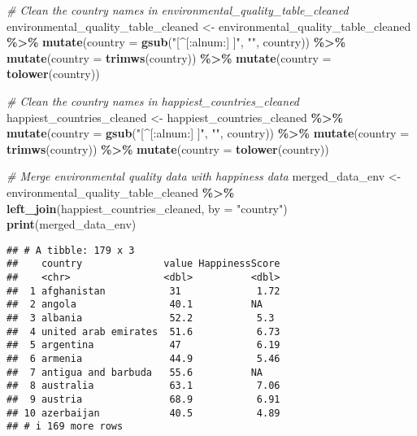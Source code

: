 \documentclass[
]{article}
\newenvironment{Shaded}{\begin{snugshade}}{\end{snugshade}}
\newcommand{\AttributeTok}[1]{\textcolor[rgb]{0.13,0.29,0.53}{#1}}
\newcommand{\CommentTok}[1]{\textcolor[rgb]{0.56,0.35,0.01}{\textit{#1}}}
\newcommand{\FunctionTok}[1]{\textcolor[rgb]{0.13,0.29,0.53}{\textbf{#1}}}
\newcommand{\NormalTok}[1]{#1}
\newcommand{\OtherTok}[1]{\textcolor[rgb]{0.56,0.35,0.01}{#1}}
\newcommand{\SpecialCharTok}[1]{\textcolor[rgb]{0.81,0.36,0.00}{\textbf{#1}}}
\newcommand{\StringTok}[1]{\textcolor[rgb]{0.31,0.60,0.02}{#1}}
\begin{document}
\begin{Shaded}
\begin{Highlighting}[]
\CommentTok{\# Clean the country names in environmental\_quality\_table\_cleaned}
\NormalTok{environmental\_quality\_table\_cleaned }\OtherTok{\textless{}{-}}\NormalTok{ environmental\_quality\_table\_cleaned }\SpecialCharTok{\%\textgreater{}\%}
  \FunctionTok{mutate}\NormalTok{(}\AttributeTok{country =} \FunctionTok{gsub}\NormalTok{(}\StringTok{"[\^{}[:alnum:] ]"}\NormalTok{, }\StringTok{""}\NormalTok{, country)) }\SpecialCharTok{\%\textgreater{}\%}  
  \FunctionTok{mutate}\NormalTok{(}\AttributeTok{country =} \FunctionTok{trimws}\NormalTok{(country)) }\SpecialCharTok{\%\textgreater{}\%}                  
  \FunctionTok{mutate}\NormalTok{(}\AttributeTok{country =} \FunctionTok{tolower}\NormalTok{(country))                     }

\CommentTok{\# Clean the country names in happiest\_countries\_cleaned}
\NormalTok{happiest\_countries\_cleaned }\OtherTok{\textless{}{-}}\NormalTok{ happiest\_countries\_cleaned }\SpecialCharTok{\%\textgreater{}\%}
  \FunctionTok{mutate}\NormalTok{(}\AttributeTok{country =} \FunctionTok{gsub}\NormalTok{(}\StringTok{"[\^{}[:alnum:] ]"}\NormalTok{, }\StringTok{""}\NormalTok{, country)) }\SpecialCharTok{\%\textgreater{}\%}  
  \FunctionTok{mutate}\NormalTok{(}\AttributeTok{country =} \FunctionTok{trimws}\NormalTok{(country)) }\SpecialCharTok{\%\textgreater{}\%}                    
  \FunctionTok{mutate}\NormalTok{(}\AttributeTok{country =} \FunctionTok{tolower}\NormalTok{(country))                     }

\CommentTok{\# Merge environmental quality data with happiness data}
\NormalTok{merged\_data\_env }\OtherTok{\textless{}{-}}\NormalTok{ environmental\_quality\_table\_cleaned }\SpecialCharTok{\%\textgreater{}\%}
  \FunctionTok{left\_join}\NormalTok{(happiest\_countries\_cleaned, }\AttributeTok{by =} \StringTok{"country"}\NormalTok{)}
\FunctionTok{print}\NormalTok{(merged\_data\_env)}
\end{Highlighting}
\end{Shaded}

\begin{verbatim}
## # A tibble: 179 x 3
##    country              value HappinessScore
##    <chr>                <dbl>          <dbl>
##  1 afghanistan           31             1.72
##  2 angola                40.1          NA   
##  3 albania               52.2           5.3 
##  4 united arab emirates  51.6           6.73
##  5 argentina             47             6.19
##  6 armenia               44.9           5.46
##  7 antigua and barbuda   55.6          NA   
##  8 australia             63.1           7.06
##  9 austria               68.9           6.91
## 10 azerbaijan            40.5           4.89
## # i 169 more rows
\end{verbatim}
\end{document}
